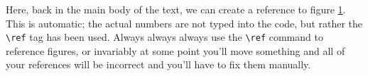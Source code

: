 \begin{figure}[h!]
\label{fig:aFigure}
\end{figure}



Here, back in the main body of the text, we can create a reference to figure \ref{fig:aFigure}.  This is automatic; the actual numbers are not typed into the code, but rather the \texttt{\textbackslash ref} tag has been used.  Always always always use the \texttt{\textbackslash ref} command to reference figures, or invariably at some point you'll move something and all of your references will be incorrect and you'll have to fix them manually.

